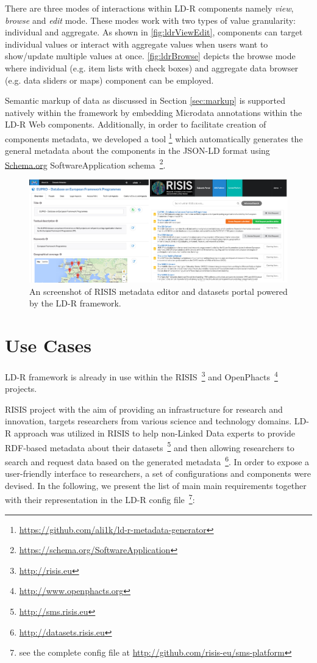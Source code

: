 \documentclass{acm_proc_article-sp}
\begin{document}
There are three modes of interactions within LD-R components namely \emph{view}, \emph{browse} and \emph{edit} mode.
These modes work with two types of value granularity: individual and aggregate.
As shown in \autoref{fig:ldrViewEdit}, components can target individual values or interact with aggregate values when users want to show/update multiple values at once.
\autoref{fig:ldrBrowse} depicts the browse mode where individual (e.g. item lists with check boxes) and aggregate data browser (e.g. data sliders or maps) component can be employed.

Semantic markup of data as discussed in Section \ref{sec:markup} is supported natively within the framework by embedding Microdata annotations within the LD-R Web components.
Additionally, in order to facilitate creation of components metadata, we developed a tool \footnote{\url{https://github.com/ali1k/ld-r-metadata-generator}} which automatically generates the general metadata about the components in the JSON-LD format using \url{Schema.org} SoftwareApplication schema~\footnote{\url{https://schema.org/SoftwareApplication}}.

\begin{figure}[ht] 
  \includegraphics[width=1\linewidth]{images/screenshots.jpg}
  \caption{An screenshot of RISIS metadata editor and datasets portal powered by the LD-R framework.}
  \label{fig:risisScreenshot}
\end{figure}

\section{Use Cases}

LD-R framework is already in use within the RISIS~\footnote{\url{http://risis.eu}} and OpenPhacts~\footnote{\url{http://www.openphacts.org}} projects.

RISIS project with the aim of providing an infrastructure for research and innovation, targets researchers from various science and technology domains.
LD-R approach was utilized in RISIS to help non-Linked Data experts to provide RDF-based metadata about their datasets~\footnote{\url{http://sms.risis.eu}} and then allowing researchers to search and request data based on the generated metadata~\footnote{\url{http://datasets.risis.eu}}.
In order to expose a user-friendly interface to researchers, a set of configurations and components were devised. 
In the following, we present the list of main main requirements together with their representation in the LD-R config file~\footnote{see the complete config file at \url{http://github.com/risis-eu/sms-platform}}:
\end{document}
